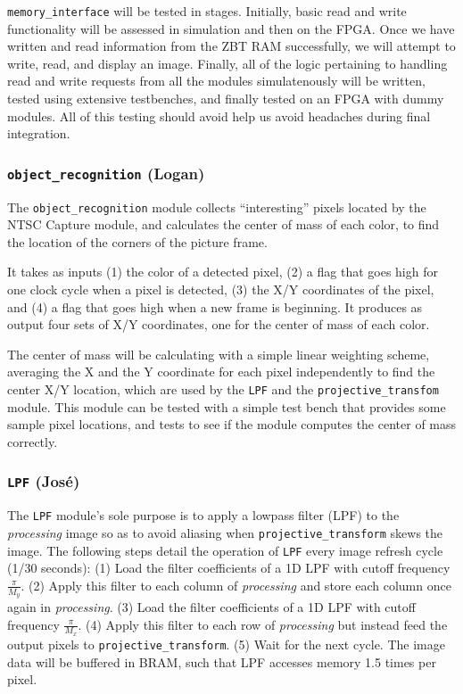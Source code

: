 \documentclass[10pt]{article}
\begin{document}
{\tt memory\_interface} will be tested in stages. Initially, basic read and write functionality will be assessed in simulation and then on the FPGA. Once we have written and read information from the ZBT RAM successfully, we will attempt to write, read, and display an image. Finally, all of the logic pertaining to handling read and write requests from all the modules simulatenously will be written, tested using extensive testbenches, and finally tested on an FPGA with dummy modules. All of this testing should avoid help us avoid headaches during final integration.

\subsubsection{{\tt object\_recognition} (Logan)}
The {\tt object\_recognition} module collects ``interesting'' pixels located by the NTSC Capture module, and calculates the center of mass of each color, to find the location of the corners of the picture frame.

It takes as inputs (1) the color of a detected pixel, (2) a flag that goes high for one clock cycle when a pixel is detected, (3) the X/Y coordinates of the pixel, and (4) a flag that goes high when a new frame is beginning. It produces as output four sets of X/Y coordinates, one for the center of mass of each color.

The center of mass will be calculating with a simple linear weighting scheme, averaging the X and the Y coordinate for each pixel independently to find the center X/Y location, which are used by the {\tt LPF} and the {\tt projective\_transfom} module. This module can be tested with a simple test bench that provides some sample pixel locations, and tests to see if the module computes the center of mass correctly.

\subsubsection{{\tt LPF} (Jos\'{e})}
The {\tt LPF} module's sole purpose is to apply a lowpass filter (LPF) to the {\it processing} image so as to avoid aliasing when {\tt projective\_transform} skews the image. The following steps detail the operation of {\tt LPF} every image refresh cycle (1/30 seconds): (1) Load the filter coefficients of a 1D LPF with cutoff frequency \( \frac{\pi}{M_y} \). (2) Apply this filter to each column of {\it processing} and store each column once again in {\it processing}. (3) Load the filter coefficients of a 1D LPF with cutoff frequency \( \frac{\pi}{M_x} \). (4) Apply this filter to each row of {\it processing} but instead feed the output pixels to {\tt projective\_transform}. (5) Wait for the next cycle. The image data will be buffered in BRAM, such that LPF accesses memory 1.5 times per pixel.
\end{document}
